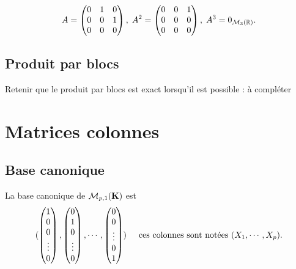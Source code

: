 \begin{exple} 
\[
 A = 
 \begin{pmatrix}
  0 & 1 & 0 \\ 0 & 0 & 1 \\ 0 & 0 & 0 
 \end{pmatrix}, \;
A^2 = 
 \begin{pmatrix}
  0 & 0 & 1 \\ 0 & 0 & 0 \\ 0 & 0 & 0 
 \end{pmatrix},\;
 A^3 = 0_{\mathcal{M}_3(\mathbb{R})}.
\] 
\end{exple}

\subsection{Produit par blocs}
Retenir que le produit par blocs est exact lorsqu'il est possible :  à compléter


\section{Matrices colonnes}
\subsection{Base canonique}
\begin{defi} 
 La base canonique de $\mathcal{M}_{p,1}(\mathbf{K})$ est 
\[
 ( 
 \begin{pmatrix}
  1 \\ 0 \\ 0 \\ \vdots \\ 0
 \end{pmatrix},
\begin{pmatrix}
  0 \\ 1 \\ 0 \\ \vdots \\ 0
 \end{pmatrix},
 \cdots, 
 \begin{pmatrix}
  0 \\ 0 \\ \vdots \\ 0 \\ 1
 \end{pmatrix}
 )
\hspace{0.5cm} \text{ces colonnes sont notées } (X_1, \cdots, X_p). 
\]
\end{defi}


